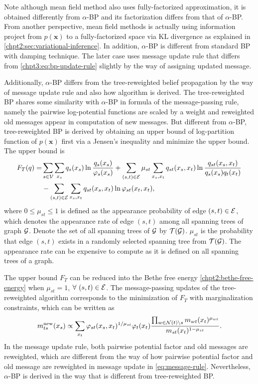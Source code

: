 Note although mean field method also uses fully-factorized approximation, it is obtained differently from $\alpha$-BP and its factorization differs from that of $\alpha$-BP. From another perspective, mean field methods is actually using information project from $p(\bm{x})$ to a fully-factorized space via KL divergence as explained in \autoref{chpt2:sec:variational-inference}.
In addition, 
$\alpha$-BP is different from standard BP with damping technique. The later case uses message update rule that differs from \eqref{chpt3:eq:bp-update-rule} slightly by the way of assigning  updated message. 


Additionally, $\alpha$-BP differs from the tree-reweighted belief propagation \cite{wainwright2008graphical} by the way of message update rule and also how algorithm is derived. 
The tree-reweighted BP shares some similarity with $\alpha$-BP in formula of the message-passing rule, namely the pairwise log-potential functions are scaled by a weight and reweighted old messages appear in computation of new messages. But different from $\alpha$-BP, tree-reweighted BP is derived by obtaining an upper bound of log-partition function of $p(\bm{x})$ first via a Jensen's inequality and minimize the upper bound. The upper bound is
\begin{align}
  F_T(q) =& \sum_{s\in\mathcal{V}}\sum_{x_s}q_s(x_s) \ln{\frac{q_s(x_s)}{\varphi_s(x_s)}}  + \sum_{(s,t)\in\mathcal{E}}\mu_{st}\sum_{x_s, x_t} q_{st}(x_s, x_t) \ln\frac{q_{st}(x_s,x_t)}{q_s(x_s)q_t(x_t)} \nonumber \\
          & - \sum_{(s,t)\in\mathcal{E}}\sum_{x_s, x_t} q_{st}(x_s, x_t)\ln{\varphi_{st}(x_t, x_t)},
\end{align}
where $0\leq \mu_{st} \leq 1$ is defined as the appearance probability of edge $(s, t) \in \mathcal{E}$, which denotes the appearance rate of edge $(s,t)$ among all spanning trees of graph $\mathcal{G}$. Denote the set of all spanning trees of $\mathcal{G}$ by $\mathcal{T}(\mathcal{G})$. $\mu_{st}$ is the probability that edge $(s,t)$ exists in a randomly selected spanning tree from $\mathcal{T}(\mathcal{G})$. The appearance rate can be expensive to compute as it is defined on all spanning trees of a graph.


The upper bound $F_T$ can be reduced into the Bethe free energy \eqref{chpt2:bethe-free-energy} when $\mu_{st}=1$, $\forall ~(s,t)\in \mathcal{E}$. The message-passing updates of the tree-reweighted algorithm corresponds to the minimization of $F_T$ with marginalization constraints, which can be written as
\begin{align}
  {m}^{\text{new}}_{ts}(x_s) \propto \sum_{x_t} \varphi_{st}(x_s, x_t)^{1/\mu_{st}} {\varphi}_t(x_t) \frac{\prod_{w\in \mathcal{N}(t)\backslash s}m_{wt}(x_t)^{\mu_{wt}} }{m_{st}(x_t)^{1-\mu_{st}}}.
\end{align}
In the message update rule, both pairwise potential factor and old messages are reweighted, which are different from the way of how pairwise potential factor and old message are reweighted in message update in \eqref{eq:message-rule}. Nevertheless, $\alpha$-BP is derived in the way that is different from tree-reweighted BP.


